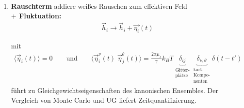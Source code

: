 \documentclass[12pt]{article}
\begin{document}
\begin{enumerate}
  
  \item \textbf{Rauschterm} addiere weißes Rauschen zum effektiven Feld \\
  \textbf{$+$ Fluktuation:}  \\
  
\begin{align*}
\vec{h}_i \to \vec{h}_i + \vec{\eta_i} (t)
\end{align*}  
  
  mit 
\begin{align*}
\langle \vec{\eta}_i (t) \rangle = 0 \qquad \text{und} \qquad \langle  \vec{\eta}_i^\nu (t)  \;  \vec{\eta}_j ^\theta (t) \rangle = \frac{2 \alpha \mu_s }{\gamma} k_B T \underbrace{\delta_{ij}}_{ \substack{ \text{Gitter-} \\ \text{plätze} }} \underbrace{\delta_{\nu, \theta}}_{ \substack{ \text{kart.} \\ \text{Kompo-} \\ \text{nenten}}} \delta (t- t')
\end{align*}  
 führt zu Gleichgewichtseigenschaften des kanonischen Ensembles. Der Vergleich von Monte Carlo und UG liefert Zeitquantifizierung.
   \end{enumerate}
\end{document}
